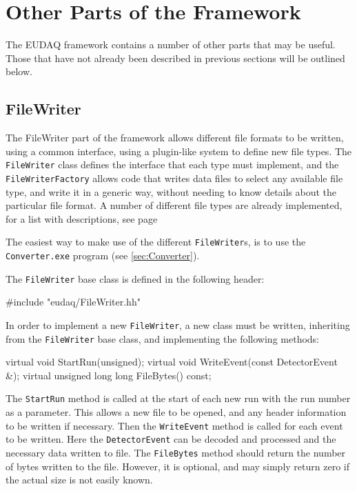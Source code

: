 \section{Other Parts of the Framework}
The EUDAQ framework contains a number of other parts that may be useful.
Those that have not already been described in previous sections will be outlined below.

\subsection{FileWriter}
The FileWriter part of the framework allows different file formats to be written,
using a common interface, using a plugin-like system to define new file types.
The \texttt{FileWriter} class defines the interface that each type must implement,
and the \texttt{FileWriterFactory} allows code that writes data files to select any
available file type, and write it in a generic way,
without needing to know details about the particular file format.
A number of different file types are already implemented,
for a list with descriptions, see page \pageref{lst:FileTypes}

The easiest way to make use of the different \texttt{FileWriter}s,
is to use the \texttt{Converter.exe} program (see \autoref{sec:Converter}).

The \texttt{FileWriter} base class is defined in the following header:
\begin{listing}
#include "eudaq/FileWriter.hh"
\end{listing}

In order to implement a new \texttt{FileWriter}, a new class must be written,
inheriting from the \texttt{FileWriter} base class, and implementing the following methods:
\begin{listing}
virtual void StartRun(unsigned);
virtual void WriteEvent(const DetectorEvent &);
virtual unsigned long long FileBytes() const;
\end{listing}

The \texttt{StartRun} method is called at the start of each new run
with the run number as a parameter.
This allows a new file to be opened, and any header information to be written if necessary.
Then the \texttt{WriteEvent} method is called for each event to be written.
Here the \texttt{DetectorEvent} can be decoded and processed
and the necessary data written to file.
The \texttt{FileBytes} method should return the number of bytes written to the file.
However, it is optional, and may simply return zero if the actual size is not easily known.

